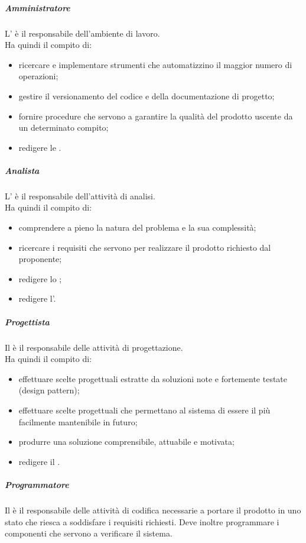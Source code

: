 				\subparagraph{Amministratore}
				L'\roleAdministrator{} è il responsabile dell'ambiente di lavoro. \\
				Ha quindi il compito di:
					\begin{itemize}
						\item ricercare e implementare strumenti che automatizzino il maggior numero di operazioni;
						\item gestire il versionamento del codice e della documentazione di progetto;
						\item fornire procedure che servono a garantire la qualità del prodotto uscente da un determinato compito;
						\item redigere le \docNameVersionNdP.
					\end{itemize}
				\subparagraph{Analista}
				L'\roleAnalyst{} è il responsabile dell'attività di analisi.\\
				Ha quindi il compito di:
					\begin{itemize}
						\item comprendere a pieno la natura del problema e la sua complessità;
						\item ricercare i requisiti che servono per realizzare il prodotto richiesto dal proponente;
						\item redigere lo \docNameVersionSdF;
						\item redigere l'\docNameVersionAdR.
					\end{itemize}
				\subparagraph{Progettista}
				Il \roleDesigner{} è il responsabile delle attività di progettazione. \\
				Ha quindi il compito di:
					\begin{itemize}
						\item effettuare scelte progettuali estratte da soluzioni note e fortemente testate (design pattern);
						\item effettuare scelte progettuali che permettano al sistema di essere il più facilmente mantenibile in futuro;
						\item produrre una soluzione comprensibile, attuabile e motivata;
						\item redigere il \docNameVersionPdQ.
					\end{itemize}
				\subparagraph{Programmatore}
				Il \roleProgrammer{} è il responsabile delle attività di codifica necessarie a portare il prodotto in uno stato che riesca a soddisfare i requisiti richiesti. Deve inoltre programmare i componenti che servono a verificare il sistema. \\
